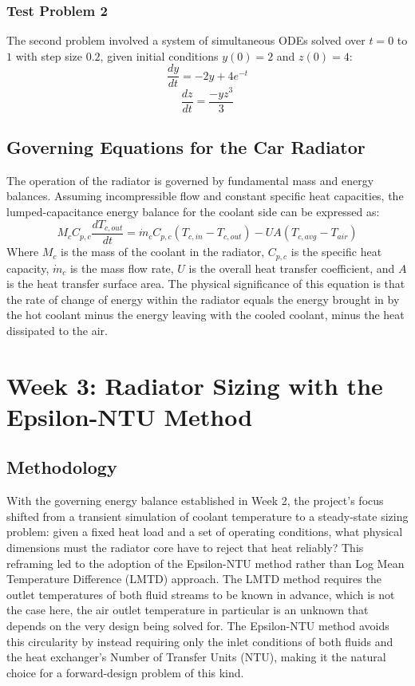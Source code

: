 \documentclass[12pt, a4paper]{article}
\begin{document}
\subsubsection{Test Problem 2}
The second problem involved a system of simultaneous ODEs solved over $t = 0$ to $1$ with step size $0.2$, given initial conditions $y(0) = 2$ and $z(0) = 4$:
\begin{equation}
    \frac{dy}{dt} = -2y + 4e^{-t}
\end{equation}
\begin{equation}
    \frac{dz}{dt} = \frac{-yz^3}{3}
\end{equation}

\subsection{Governing Equations for the Car Radiator}
The operation of the radiator is governed by fundamental mass and energy balances. Assuming incompressible flow and constant specific heat capacities, the lumped-capacitance energy balance for the coolant side can be expressed as:
\begin{equation}
    M_c C_{p,c} \frac{dT_{c,out}}{dt} = \dot{m}_c C_{p,c} (T_{c,in} - T_{c,out}) - U A (T_{c,avg} - T_{air})
\end{equation}
Where $M_c$ is the mass of the coolant in the radiator, $C_{p,c}$ is the specific heat capacity, $\dot{m}_c$ is the mass flow rate, $U$ is the overall heat transfer coefficient, and $A$ is the heat transfer surface area. The physical significance of this equation is that the rate of change of energy within the radiator equals the energy brought in by the hot coolant minus the energy leaving with the cooled coolant, minus the heat dissipated to the air.

\section{Week 3: Radiator Sizing with the Epsilon-NTU Method}

\subsection{Methodology}
With the governing energy balance established in Week 2, the project's focus shifted from a transient simulation of coolant temperature to a steady-state sizing problem: given a fixed heat load and a set of operating conditions, what physical dimensions must the radiator core have to reject that heat reliably? This reframing led to the adoption of the Epsilon-NTU method rather than Log Mean Temperature Difference (LMTD) approach. The LMTD method requires the outlet temperatures of both fluid streams to be known in advance, which is not the case here, the air outlet temperature in particular is an unknown that depends on the very design being solved for. The Epsilon-NTU method avoids this circularity by instead requiring only the inlet conditions of both fluids and the heat exchanger's Number of Transfer Units (NTU), making it the natural choice for a forward-design problem of this kind.
\end{document}
